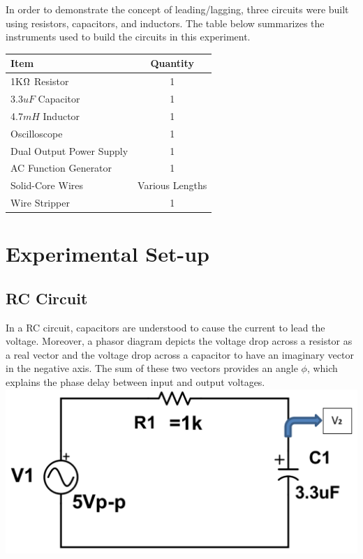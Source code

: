 \documentclass[journal]{IEEEtran}
\begin{document}
\noindent In order to demonstrate the concept of leading/lagging, three circuits were built using resistors, capacitors, and inductors. The table below summarizes the instruments used to build the circuits in this experiment. \\

\begingroup
    \medskip
\centering
\def\arraystretch{1.5}
\begin{tabular}{lc}
\toprule
Item & Quantity \\
\midrule
1K$\ohm$ Resistor & 1 \\
3.3$uF$ Capacitor & 1 \\
4.7$mH$ Inductor & 1 \\
Oscilloscope & 1 \\
Dual Output Power Supply & 1 \\
AC Function Generator & 1 \\
Solid-Core Wires & Various Lengths \\
Wire Stripper & 1 \\
\bottomrule
\end{tabular}
\label{fig:table}
    \medskip
\endgroup



\section{Experimental Set-up}

\subsection{RC Circuit}
\noindent In a RC circuit, capacitors are understood to cause the current to lead the voltage. Moreover, a phasor diagram depicts the voltage drop across a resistor as a real vector and the voltage drop across a capacitor to have an imaginary vector in the negative axis. The sum of these two vectors provides an angle $\phi$, which explains the phase delay between input and output voltages.\\

\begingroup
    \centering
    \medskip
    \includegraphics[width=\columnwidth]{images/lab8_circuit1.png}
    \label{fig:circ1}
    \medskip
\endgroup
\end{document}
